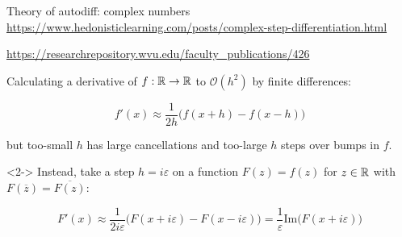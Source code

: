 \documentclass[aspectratio=169]{beamer}
\begin{document}




\begin{frame}{Theory of autodiff: complex numbers}
\vspace{0.3 cm}
{\scriptsize \textcolor{blue}{\url{https://www.hedonisticlearning.com/posts/complex-step-differentiation.html}}}

{\scriptsize \textcolor{blue}{\url{https://researchrepository.wvu.edu/faculty_publications/426}}}

\vspace{0.3 cm}
Calculating a derivative of $f : \Bbb{R} \to \Bbb{R}$ to $\mathcal{O}(h^2)$ by finite differences:

\[ f'(x) \approx \frac{1}{2h} \bigg( f(x + h) - f(x - h) \bigg) \]

but too-small $h$ has large cancellations and too-large $h$ steps over bumps in $f$.

\vspace{0.3 cm}
\begin{uncoverenv}<2->
Instead, take a step $h = i\varepsilon$ on a function $F(z) = f(z)$ for $z \in \Bbb{R}$ with $F(\overline{z}) = \overline{F(z)}$:

\[ F'(x) \approx \frac{1}{2i\varepsilon} \bigg( F(x + i\varepsilon) - F(x - i\varepsilon) \bigg) = \frac{1}{\varepsilon} \mbox{Im}\bigg( F(x + i\varepsilon) \bigg) \]
\end{uncoverenv}

\vspace{0.3 cm}
\end{frame}
\end{document}
